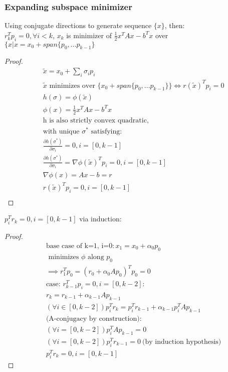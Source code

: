 \documentclass[8pt,letter]{article}
\begin{document}
\begin{multicols*}{2}
  \vfill\null
  \columnbreak
  
  \subsubsection{Expanding subspace minimizer}
  Using conjugate directions to generate sequence $\{x\}$, then:\\
  $r_k^T p_i = 0, \forall i < k$, $x_k$ is minimizer of $\frac{1}{2} x^TAx - b^Tx$ over $\{ x | x= x_0 + span\{p_0,...p_{k-1}\}$
  \begin{proof}
    \begin{align*}
      &\tilde{x} = x_0 + \sum_i \sigma_i p_i\\
      &\tilde{x} \text{ minimizes over }\{x_0 + span\{ p_0, ... p_{k-1}\}\} \iff r(\tilde{x})^Tp_i = 0\\
      &h(\sigma) = \phi(\tilde{x})\\
      &\phi(x) =\frac{1}{2}x^TAx-b^Tx\\
      &\text{h is also strictly convex quadratic,}\\
      &\text{with unique }\sigma^*\text{ satisfying:}\\
      &\frac{\partial h(\sigma^*)}{\partial \sigma_i} = 0, i=[0,k-1]\\
      &\frac{\partial h(\sigma^*)}{\partial \sigma_i} = \nabla \phi(\tilde{x})^T p_i = 0, i = [0,k-1]\\
      &\nabla \phi(x) = Ax-b=r\\
      &r(\tilde{x})^T p_i = 0, i=[0,k-1]\\
    \end{align*}  
  \end{proof}
  $p_i^T r_k=0, i=[0,k-1]$ via induction:
  \begin{proof}
    \begin{align*}
      &\text{base case of k=1, i=0}: x_1 = x_0 + \alpha_0 p_0\\
      &\text{ minimizes } \phi \text{ along } p_0\\
      &\implies r_1^T p_0 = (r_0 + \alpha_0  A p_0)^T p_0= 0 \\
      &\text{case: }r_{k-1}^T p_i = 0, i=[0,k-2]:\\
      &r_k = r_{k-1} + \alpha_{k-1} A p_{k-1}\\
      &(\forall i\in[0,k-2]) p_i^T r_k = p_i^T r_{k-1} + \alpha_{k-1} p_i^T A p_{k-1}\\
      &\text{(A-conjugacy by construction):}\\
      &(\forall i=[0,k-2]) p_i^T A p_{k-1}=0\\
      &(\forall i=[0,k-2]) p_i^T r_{k-1} = 0\ \text{(by induction hypothesis)}\\
      &p_i^T r_k = 0, i=[0,k-1]
    \end{align*}
  \end{proof}


\end{multicols*}
\end{document}
